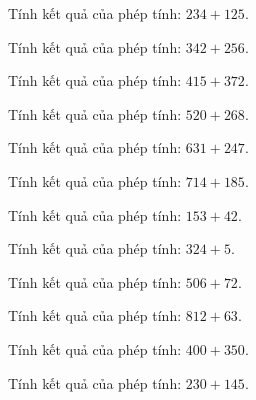 \begin{ex}
Tính kết quả của phép tính: $234 + 125$.
\end{ex}

\begin{ex}
Tính kết quả của phép tính: $342 + 256$.
\end{ex}

\begin{ex}
Tính kết quả của phép tính: $415 + 372$.
\end{ex}

\begin{ex}
Tính kết quả của phép tính: $520 + 268$.
\end{ex}

\begin{ex}
Tính kết quả của phép tính: $631 + 247$.
\end{ex}

\begin{ex}
Tính kết quả của phép tính: $714 + 185$.
\end{ex}

\begin{ex}
Tính kết quả của phép tính: $153 + 42$.
\end{ex}

\begin{ex}
Tính kết quả của phép tính: $324 + 5$.
\end{ex}

\begin{ex}
Tính kết quả của phép tính: $506 + 72$.
\end{ex}

\begin{ex}
Tính kết quả của phép tính: $812 + 63$.
\end{ex}

\begin{ex}
Tính kết quả của phép tính: $400 + 350$.
\end{ex}

\begin{ex}
Tính kết quả của phép tính: $230 + 145$.
\end{ex}

